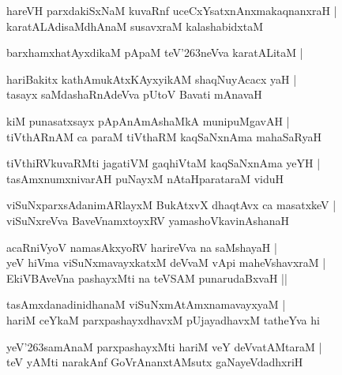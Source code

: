 \documentclass[twoside,12pt,openright]{book}
\def\S{\char'263}
\newcounter{shloka}[chapter]
\begin{document}
\begin{shloka}
hareVH parxdakiSxNaM kuvaRnf uceCxYsatxnAnxmakaqnanxraH |\\
karatALAdisaMdhAnaM susavxraM kalashabidxtaM 
\end{shloka}

\begin{shloka}
barxhamxhatAyxdikaM pApaM teV\S neVva karatALitaM |\\
\end{shloka}

\begin{shloka}
hariBakitx kathAmukAtxKAyxyikAM shaqNuyAcacx yaH |\\
tasayx saMdashaRnAdeVva pUtoV Bavati mAnavaH  
\end{shloka}

\begin{shloka}
kiM punasatxsayx pApAnAmAshaMkA munipuMgavAH |\\
tiVthARnAM ca paraM tiVthaRM kaqSaNxnAma mahaSaRyaH 
\end{shloka}

\begin{shloka}
tiVthiRVkuvaRMti jagatiVM gaqhiVtaM kaqSaNxnAma yeYH |\\
tasAmxnumxnivarAH puNayxM  nAtaHparataraM viduH
\end{shloka}

\begin{shloka}
viSuNxparxsAdanimARlayxM BukAtxvX dhaqtAvx ca masatxkeV |\\
viSuNxreVva BaveVnamxtoyxRV yamashoVkavinAshanaH 
\end{shloka}

\begin{shloka}
acaRniVyoV namasAkxyoRV harireVva na saMshayaH |\\
yeV hiVma  viSuNxmavayxkatxM deVvaM vApi maheVshavxraM |\\
EkiVBAveVna pashayxMti na teVSAM punarudaBxvaH ||
\end{shloka}

\begin{shloka}
tasAmxdanadinidhanaM viSuNxmAtAmxnamavayxyaM |\\
hariM ceYkaM parxpashayxdhavxM pUjayadhavxM tatheYva hi 
\end{shloka}

\begin{shloka}
yeV\S samAnaM parxpashayxMti hariM veY deVvatAMtaraM |\\
teV yAMti narakAnf GoVrAnanxtAMsutx gaNayeVdadhxriH 
\end{shloka}
\end{document}
